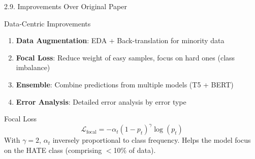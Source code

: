 \documentclass[11pt, aspectratio=169]{beamer}
\begin{document}
\begin{frame}[shrink=5]{2.9. Improvements Over Original Paper}

\begin{block}{Data-Centric Improvements}
  \begin{enumerate}
    \item \textbf{Data Augmentation}: EDA + Back-translation for minority data
    \item \textbf{Focal Loss}: Reduce weight of easy samples, focus on hard ones (class imbalance)
    \item \textbf{Ensemble}: Combine predictions from multiple models (T5 + BERT)
    \item \textbf{Error Analysis}: Detailed error analysis by error type
  \end{enumerate}
\end{block}

\vspace{0.2cm}
\begin{block}{Focal Loss}
  \[
    \mathcal{L}_{\text{focal}} = -\alpha_t (1 - p_t)^\gamma \log(p_t)
  \]
  With $\gamma = 2$, $\alpha_t$ inversely proportional to class frequency. Helps the model focus on the HATE class (comprising $<$10\% of data).
\end{block}
\end{frame}
\end{document}
